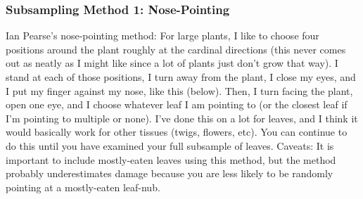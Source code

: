 \documentclass[
  letterpaper,
  oneside,
  open=any]{scrbook}
\begin{document}
\subsubsection{Subsampling Method 1:
Nose-Pointing}\label{subsampling-method-1-nose-pointing}

Ian Pearse's nose-pointing method: For large plants, I like to choose
four positions around the plant roughly at the cardinal directions (this
never comes out as neatly as I might like since a lot of plants just
don't grow that way). I stand at each of those positions, I turn away
from the plant, I close my eyes, and I put my finger against my nose,
like this (below). Then, I turn facing the plant, open one eye, and I
choose whatever leaf I am pointing to (or the closest leaf if I'm
pointing to multiple or none). I've done this on a lot for leaves, and I
think it would basically work for other tissues (twigs, flowers, etc).
You can continue to do this until you have examined your full subsample
of leaves. Caveats: It is important to include mostly-eaten leaves using
this method, but the method probably underestimates damage because you
are less likely to be randomly pointing at a mostly-eaten leaf-nub.

\begin{figure}

\begin{minipage}{0.50\linewidth}



\end{minipage}%
%
\begin{minipage}{0.50\linewidth}



\end{minipage}%

\end{figure}%
\end{document}
